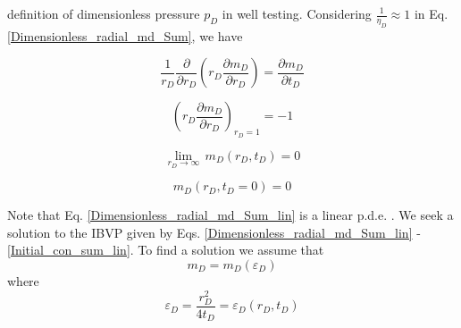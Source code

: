 \documentclass{llncs}
\numberwithin{equation}{section}
\numberwithin{figure}{section}
\numberwithin{table}{section}
\begin{document}
     definition of dimensionless pressure $p_{D}$ in well testing.
    Considering $\frac{1}{{{\eta }_{D}}}\approx 1$ in Eq. \ref{Dimensionless_radial_md_Sum}, we have
    
    \begin{equation}
        \frac{1}{{{r}_{D}}}\frac{\partial }{\partial {{r}_{D}}}\left( {{r}_{D}}\frac{\partial {{m}_{D}}}{\partial {{r}_{D}}} \right)=\frac{\partial {{m}_{D}}}{\partial {{t}_{D}}}
        \label{Dimensionless_radial_md_Sum_lin}
    \end{equation}

    \begin{equation}
        {{\left( {{r}_{D}}\frac{\partial {{m}_{D}}}{\partial {{r}_{D}}} \right)}_{{{r}_{D}}=1}}=-1
        \label{Boundary_1_sum_lin}
    \end{equation}

    \begin{equation}
        \underset{{{r}_{D}}\to \infty }{\mathop{\lim }}\,{{m}_{D}}\left( {{r}_{D}},{{t}_{D}} \right)=0
        \label{Boundary_2_sum_lin}
    \end{equation}

    \begin{equation}
        {{m}_{D}}\left( {{r}_{D}},{{t}_{D}}=0 \right)=0
        \label{Initial_con_sum_lin}
    \end{equation}      
    
    Note that Eq. \ref{Dimensionless_radial_md_Sum_lin} is a linear p.d.e. . We seek a solution to the IBVP given by Eqs. \ref{Dimensionless_radial_md_Sum_lin} - \ref{Initial_con_sum_lin}. To find a solution we assume that
    \begin{equation*}    
    {{m}_{D}}={{m}_{D}}\left( {{\varepsilon }_{D}} \right)
    \end{equation*}    
    where
    \begin{equation*}
    {{\varepsilon }_{D}}=\frac{r_{D}^{2}}{4{{t}_{D}}}={{\varepsilon }_{D}}\left( {{r}_{D}},{{t}_{D}} \right)
    \end{equation*}     
    

    
    
%
\end{document}
